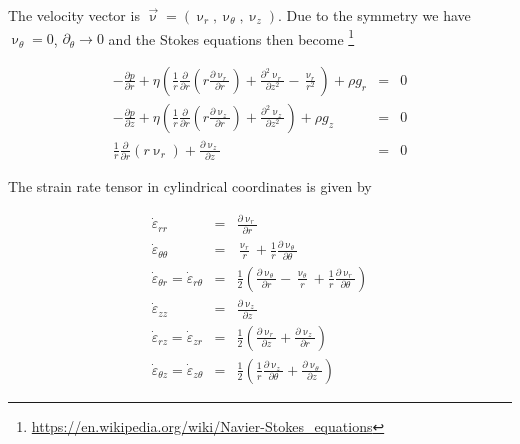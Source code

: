 The velocity vector is $\vec{\upnu}=(\upnu_r,\upnu_\theta,\upnu_z)$. 
Due to the symmetry we have $\upnu_\theta=0$, $\partial_\theta \rightarrow 0$ 
and the Stokes equations 
then become \footnote{\url{https://en.wikipedia.org/wiki/Navier-Stokes_equations}}

\begin{eqnarray}
-\frac{\partial p}{\partial r} + \eta
\left(
\frac1r \frac{\partial}{\partial r} ( r  \frac{\partial \upnu_r}{\partial r}   ) 
+  \frac{\partial^2 \upnu_r}{\partial z^2} - \frac{\upnu_r}{r^2}
\right) +\rho g_r&=& 0 
\\
-\frac{\partial p}{\partial z} + \eta
\left(
\frac1r \frac{\partial}{\partial r} ( r  \frac{\partial \upnu_z}{\partial r}   ) 
+  \frac{\partial^2 \upnu_z}{\partial z^2} 
\right) +\rho g_z&=& 0 \\
\frac1r \frac{\partial}{\partial r} (r \upnu_r) + \frac{\partial \upnu_z}{\partial z} &=& 0
\end{eqnarray}


The strain rate tensor in cylindrical coordinates is given by 

\begin{eqnarray}
\dot\varepsilon_{rr} 
&=& \frac{\partial \upnu_r}{\partial r} 
\\
\dot\varepsilon_{\theta\theta} 
&=& \frac{\upnu_r}{r} + \frac{1}{r} \frac{\partial \upnu_\theta}{\partial \theta}  
\\
\dot\varepsilon_{\theta r} = \dot\varepsilon_{r\theta} 
&=& \frac{1}{2} \left(   \frac{\partial \upnu_\theta}{\partial r} - \frac{\upnu_\theta}{r} 
+\frac{1}{r} \frac{\partial \upnu_r}{\partial \theta}  \right)
\\
\dot\varepsilon_{zz} 
&=& \frac{\partial \upnu_z}{\partial z} 
\\
\dot{\varepsilon}_{rz} = \dot{\varepsilon}_{zr} 
&=& \frac{1}{2}\left( \frac{\partial \upnu_r}{\partial z} + \frac{\partial \upnu_z}{\partial r}  \right) 
\\
\dot{\varepsilon}_{\theta z} = \dot{\varepsilon}_{z \theta} &=& \frac{1}{2}\left( 
\frac{1}{r} \frac{\partial \upnu_z}{\partial \theta} + \frac{\partial \upnu_\theta}{\partial z}  \right) 
\end{eqnarray}

